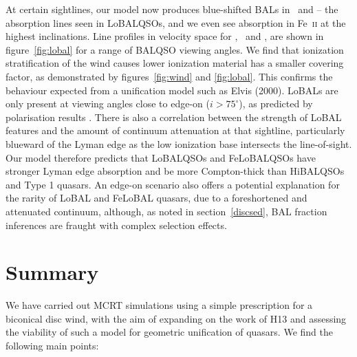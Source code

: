 \documentclass[useAMS,usenatbib]{mn2e_x}
\begin{document}
At certain sightlines, our model now produces blue-shifted BALs in \al\ and \mg --
the absorption lines seen in LoBALQSOs, and we even see absorption in Fe~\textsc{ii}
at the highest inclinations. Line profiles in velocity space 
for \civ, \al\ and \mg, are shown in figure~\ref{fig:lobal} for a range
of BALQSO viewing angles. We find that ionization stratification
of the wind causes lower ionization material has a smaller covering factor, 
as demonstrated by figures~\ref{fig:wind} and \ref{fig:lobal}.
This confirms the behaviour expected from a unification model such as Elvis (2000). 
LoBALs are only present at viewing angles close to edge-on ($i>75^\circ$),
as predicted by polarisation results \citep{brotherton1997}.
There is also a correlation between the strength of LoBAL features
and the amount of continuum attenuation at that sightline, particularly
blueward of the Lyman edge as the low ionization base 
intersects the line-of-sight. 
Our model therefore predicts that LoBALQSOs and FeLoBALQSOs 
have stronger Lyman edge absorption and 
be more Compton-thick than HiBALQSOs and Type 1 quasars.
An edge-on scenario also offers a potential explanation for the rarity of LoBAL and
FeLoBAL quasars, due to a foreshortened and attenuated continuum, 
although, as noted in section~\ref{discsed}, BAL fraction 
inferences are fraught with complex selection effects.






\section{Summary}

We have carried out MCRT simulations using a simple
prescription for a biconical disc wind, with
the aim of expanding on the work of H13 and assessing 
the viability of such a model for geometric unification of quasars.
We find the following main points:
\end{document}
